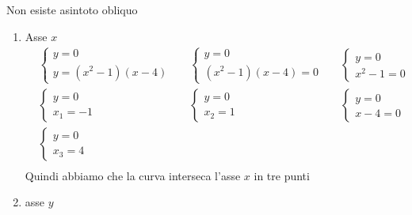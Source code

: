 \begin{exercise}
\begin{itemize}
\begin{enumerate}
		Non esiste asintoto obliquo
	\end{enumerate}
	\begin{enumerate}
		\item Asse $x$
		\begin{align*}
		&\begin{cases}
		y=0\\
		y=(x^2-1)(x-4)
		\end{cases}&
		&\begin{cases}
		y=0\\
		(x^2-1)(x-4)=0
		\end{cases}
		&
		&\begin{cases}
		y=0\\
		x^2-1=0
		\end{cases}\\
		&\begin{cases}
		y=0\\
		x_1=-1
		\end{cases}&
		&\begin{cases}
		y=0\\
		x_2=1
		\end{cases}&&\begin{cases}
		y=0\\
		x-4=0
		\end{cases}\\
		&\begin{cases}
		y=0\\
		x_3=4
		\end{cases}\\
		\end{align*}
			Quindi abbiamo che la curva interseca l'asse $x$ in tre punti
		\item asse $y$
		

\end{enumerate}
\end{itemize}
\end{exercise}
